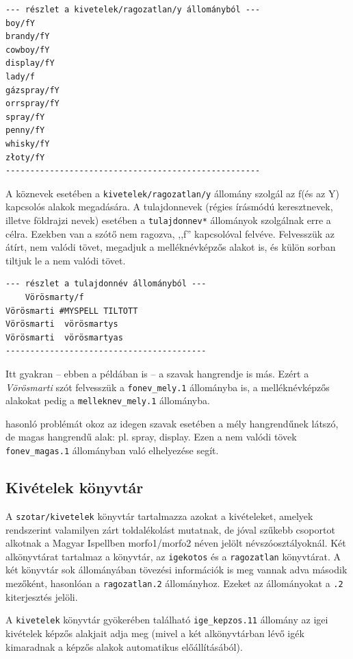 \begin{verbatim}
--- részlet a kivetelek/ragozatlan/y állományból ---
boy/fY
brandy/fY
cowboy/fY
display/fY
lady/f
gázspray/fY
orrspray/fY
spray/fY
penny/fY
whisky/fY
złoty/fY
----------------------------------------------------
\end{verbatim}

A köznevek esetében a \texttt{kivetelek/ragozatlan/y} állomány szolgál
az f(és az Y) kapcsolós alakok megadására. A tulajdonnevek
(régies írásmódú keresztnevek, illetve földrajzi nevek) esetében
a \texttt{tulajdonnev*} állományok szolgálnak erre a célra.
Ezekben van a szótő nem ragozva, ,,f'' kapcsolóval felvéve.
Felvesszük az átírt, nem valódi
tövet, megadjuk a melléknévképzős alakot is, és külön sorban tiltjuk le
a nem valódi tövet.

\begin{verbatim}
--- részlet a tulajdonnév állományból ---
	Vörösmarty/f
Vörösmarti #MYSPELL TILTOTT
Vörösmarti	vörösmartys
Vörösmarti	vörösmartyas
-----------------------------------------
\end{verbatim}

Itt gyakran -- ebben a példában is --  a szavak hangrendje is
más. Ezért a \emph{Vörösmarti} szót felvesszük a \texttt{fonev\_mely.1}
állományba is, a melléknévképzős alakokat pedig a
\texttt{melleknev\_mely.1} állományba.

hasonló problémát okoz az idegen szavak esetében a mély hangrendűnek
	látszó, de magas hangrendű alak: pl. spray, display.
Ezen a nem valódi tövek \texttt{fonev\_magas.1} állományban
való elhelyezése segít.

\subsection{Kivételek könyvtár}

A \texttt{szotar/kivetelek} könyvtár tartalmazza azokat a kivételeket,
amelyek rendszerint valamilyen zárt toldalékolást mutatnak, de jóval
szűkebb csoportot alkotnak a Magyar Ispellben morfo1/morfo2 néven jelölt
névszóosztályoknál. Két alkönyvtárat tartalmaz a könyvtár, az
\texttt{igekotos} és a \texttt{ragozatlan} könyvtárat.
A két könyvtár sok állományában tövezési információk is meg vannak
adva második mezőként, hasonlóan a \texttt{ragozatlan.2} állományhoz.
Ezeket az állományokat a \texttt{.2} kiterjesztés jelöli.

A \texttt{kivetelek} könyvtár gyökerében található \texttt{ige\_kepzos.11}
állomány az igei kivételek
képzős alakjait adja meg (mivel a két alkönyvtárban lévő igék
kimaradnak a képzős alakok automatikus előállításából).


